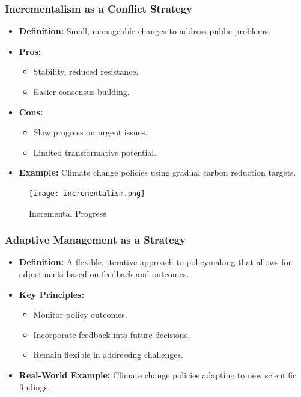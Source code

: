 \documentclass[10pt]{beamer}
\begin{document}
\begin{frame}
        \begin{frame}
        \frametitle{Incrementalism as a Conflict Strategy}
        \begin{itemize}
            \item \textbf{Definition:} Small, manageable changes to address public problems.
            \item \textbf{Pros:}
                \begin{itemize}
                    \item Stability, reduced resistance.
                    \item Easier consensus-building.
                \end{itemize}
            \item \textbf{Cons:}
                \begin{itemize}
                    \item Slow progress on urgent issues.
                    \item Limited transformative potential.
                \end{itemize}
            \item \textbf{Example:} Climate change policies using gradual carbon reduction targets.
        \end{itemize}
        
        \begin{figure}
            \centering
            \texttt{[image: incrementalism.png]}
            \caption{Incremental Progress}
        \end{figure}
        \end{frame}

        \begin{frame}
            \frametitle{Adaptive Management as a Strategy}
            \begin{itemize}
                \item \textbf{Definition:} A flexible, iterative approach to policymaking that allows for adjustments based on feedback and outcomes.
                \item \textbf{Key Principles:}
                    \begin{itemize}
                        \item Monitor policy outcomes.
                        \item Incorporate feedback into future decisions.
                        \item Remain flexible in addressing challenges.
                    \end{itemize}
                \item \textbf{Real-World Example:} Climate change policies adapting to new scientific findings.
            \end{itemize}
            

\end{frame}
\end{frame}
\end{document}
